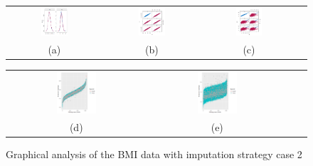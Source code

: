 	
	\begin{figure} [ht!]
		\centering
		\begin{tabular}{cccc}
			\includegraphics[width=0.3\textwidth]{plots/densitycase2} &
			\includegraphics[width=0.3\textwidth]{plots/scattercase2hm} &
			\includegraphics[width=0.3\textwidth]{plots/scattercase2wm} \\
			\textnormal{(a)}  & \textnormal{(b)} & \textnormal{(c)}  \\[6pt]
		\end{tabular}
		\begin{tabular}{cccc}
			\includegraphics[width=0.3\textwidth]{plots/distributioncase2hm} &
			\includegraphics[width=0.3\textwidth]{plots/distributioncase2wm} \\
			\textnormal{(d)}  & \textnormal{(e)}  \\[6pt]
		\end{tabular}
		\caption{Graphical analysis of the BMI data with imputation strategy case 2}
		\label{fig6_10}
	\end{figure}
	
